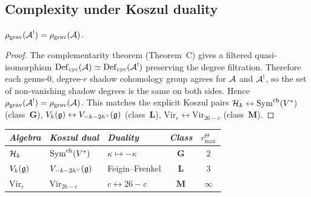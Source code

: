 \subsection{Complexity under Koszul duality}

\begin{proposition}
\ClaimStatusProvedHere
$\rho_{\mathrm{grav}}(\mathcal{A}^!) = \rho_{\mathrm{grav}}(\mathcal{A})$.
\end{proposition}

\begin{proof}
The complementarity theorem (Theorem~C) gives a filtered
quasi-isomorphism
$\mathrm{Def}_{\mathrm{cyc}}(\mathcal{A}) \simeq \mathrm{Def}_{\mathrm{cyc}}(\mathcal{A}^!)$ preserving the degree filtration.
Therefore each genus-$0$, degree-$r$ shadow cohomology group agrees for
$\mathcal{A}$ and $\mathcal{A}^!$, so the set of non-vanishing shadow degrees is the
same on both sides. Hence
$\rho_{\mathrm{grav}}(\mathcal{A}^!) = \rho_{\mathrm{grav}}(\mathcal{A})$.
This matches the explicit Koszul pairs
$\mathcal{H}_k \leftrightarrow \operatorname{Sym}^{\mathrm{ch}}(V^*)$ (class~$\mathbf{G}$),
$V_k(\mathfrak{g}) \leftrightarrow V_{-k-2h^\vee}(\mathfrak{g})$ (class~$\mathbf{L}$),
$\mathrm{Vir}_c \leftrightarrow \mathrm{Vir}_{26-c}$
(class~$\mathbf{M}$).
\end{proof}

\begin{corollary}
\ClaimStatusProvedHere
\begin{center}
\small
\renewcommand{\arraystretch}{1.15}
\begin{tabular}{lllcc}
\toprule
\emph{Algebra} & \emph{Koszul dual} &
 \emph{Duality} & \emph{Class} & \(r^\Theta_{\max}\) \\
\midrule
$\mathcal{H}_k$ & $\operatorname{Sym}^{\mathrm{ch}}(V^*)$ &
 $\kappa \mapsto -\kappa$ & $\mathbf{G}$ & $2$ \\
$V_k(\mathfrak{g})$ & $V_{-k-2h^\vee}(\mathfrak{g})$ &
 Feigin--Frenkel & $\mathbf{L}$ & $3$ \\
$\mathrm{Vir}_c$ & $\mathrm{Vir}_{26-c}$ &
 $c \leftrightarrow 26-c$ & $\mathbf{M}$ & $\infty$ \\
\bottomrule
\end{tabular}
\end{center}
\end{corollary}



